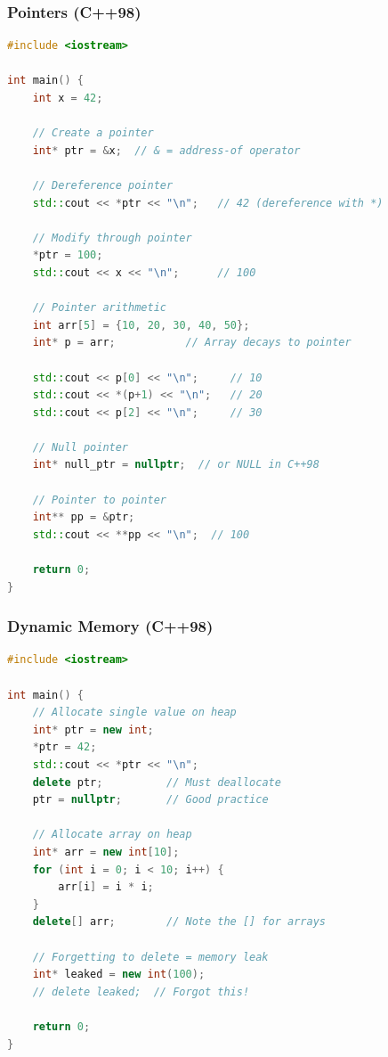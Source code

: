 \hypertarget{pointers-c98}{%
\subsubsection{Pointers (C++98)}\label{pointers-c98}}

\begin{lstlisting}[language={C++}]
#include <iostream>

int main() {
    int x = 42;

    // Create a pointer
    int* ptr = &x;  // & = address-of operator

    // Dereference pointer
    std::cout << *ptr << "\n";   // 42 (dereference with *)

    // Modify through pointer
    *ptr = 100;
    std::cout << x << "\n";      // 100

    // Pointer arithmetic
    int arr[5] = {10, 20, 30, 40, 50};
    int* p = arr;           // Array decays to pointer

    std::cout << p[0] << "\n";     // 10
    std::cout << *(p+1) << "\n";   // 20
    std::cout << p[2] << "\n";     // 30

    // Null pointer
    int* null_ptr = nullptr;  // or NULL in C++98

    // Pointer to pointer
    int** pp = &ptr;
    std::cout << **pp << "\n";  // 100

    return 0;
}
\end{lstlisting}

\hypertarget{dynamic-memory-c98}{%
\subsubsection{Dynamic Memory (C++98)}\label{dynamic-memory-c98}}

\begin{lstlisting}[language={C++}]
#include <iostream>

int main() {
    // Allocate single value on heap
    int* ptr = new int;
    *ptr = 42;
    std::cout << *ptr << "\n";
    delete ptr;          // Must deallocate
    ptr = nullptr;       // Good practice

    // Allocate array on heap
    int* arr = new int[10];
    for (int i = 0; i < 10; i++) {
        arr[i] = i * i;
    }
    delete[] arr;        // Note the [] for arrays

    // Forgetting to delete = memory leak
    int* leaked = new int(100);
    // delete leaked;  // Forgot this!

    return 0;
}
\end{lstlisting}

